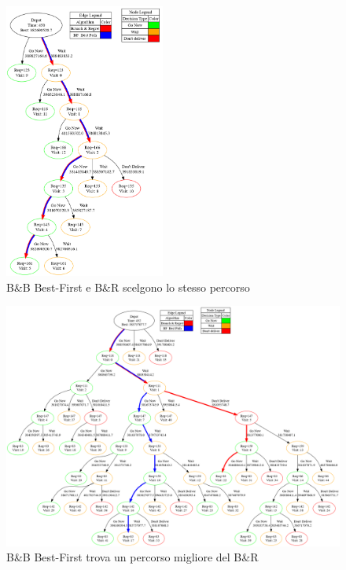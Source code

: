 \documentclass[
    article,            %
    12pt,                %
    oneside,            %
    a4paper,            %
    english,            %
    italian,                %
    sumario=tradicional,
]{abntex2}
\begin{document}
\begin{figure}[!h]
    \centering
    \includegraphics[width=0.47\textwidth]{Images/same_path.png}
    \par
    \caption{B\&B Best-First e B\&R scelgono lo stesso percorso}
    \label{fig:BBBFuguale}
\end{figure}
\newpage{}
\vspace*{\fill}
\begin{figure}[h!]
    \centering
    \includegraphics[width=1.0\textwidth]{Images/omg.png}
    \caption{B\&B Best-First trova un percorso migliore del B\&R}
    \label{fig:BBBFmigliore}
\end{figure}
\vspace*{\fill}
\end{document}
